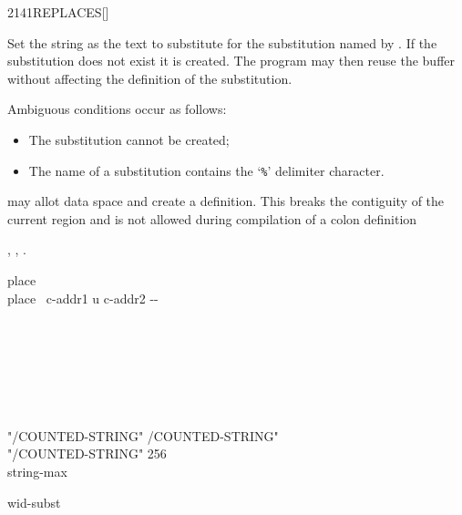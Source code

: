 \begin{worddef}{2141}{REPLACES}[]%
\item {}

	Set the string  as the text to substitute for
	the substitution named by .
	If the substitution does not exist it is created.
	The program may then reuse the buffer  without
	affecting the definition of the substitution.

	Ambiguous conditions occur as follows:
	\begin{itemize}
	\item The substitution cannot be created;
	\item The name of a substitution contains the `\texttt{\%}' delimiter character.
	\end{itemize}

	 may allot data space and create a definition.  This breaks
	the contiguity of the current region and is not allowed during compilation
	of a colon definition
  
\see {},
	,
	.

	\begin{implement} %

		\word[tools]{[UNDEFINED]} place \word[tools]{[IF]} \\
		\tab \word{:} place \tab {} \ c-addr1 u c-addr2 -{}- \\
		\tab {}  \\
		\tab {}  \\
		\tab[2]   \\
		  \word{+}   \\
		\tab[2]   \\
		\tab \word{;} \\
		\word[tools]{[THEN]}

		\word{:} "/COUNTED-STRING"  /COUNTED-STRING" \word{;} \\
		"/COUNTED-STRING"   \word[tools]{[IF]} 256 \word[tools]{[THEN]} \\
		  string-max

		  wid-subst \\
		 


\end{implement}
\end{worddef}
